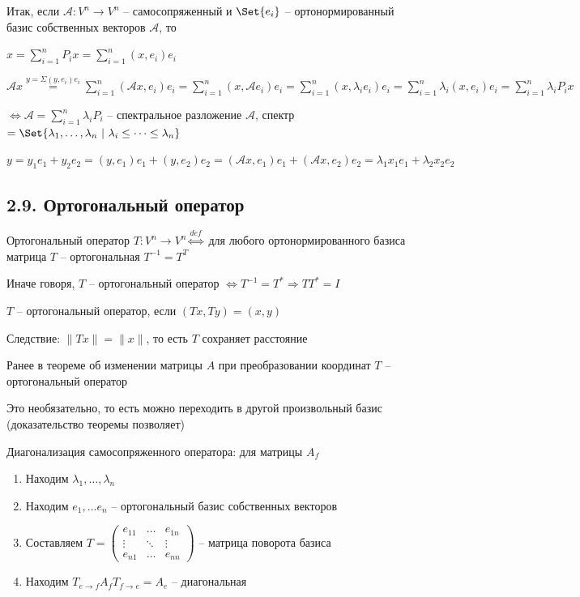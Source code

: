 \documentclass[12pt]{article}
\begin{document}
    Итак, если $\mathcal{A}: V^n \to V^n$ -- самосопряженный и $\Set{e_i}$ -- ортонормированный базис собственных векторов $\mathcal{A}$, то

    $x = \sum_{i = 1}^{n} P_i x = \sum_{i = 1}^{n} (x, e_i) e_i$

    $\mathcal{A} x \stackrel{y = \Sigma (y, e_i) e_i}{=} \sum_{i = 1}^{n} (\mathcal{A}x, e_i) e_i =
    \sum_{i = 1}^{n} (x, \mathcal{A}e_i) e_i = \sum_{i = 1}^{n} (x, \lambda_i e_i) e_i =
    \sum_{i = 1}^{n} \lambda_i (x, e_i) e_i = \sum_{i = 1}^{n} \lambda_i P_i x$

    $\Longleftrightarrow \mathcal{A} = \sum_{i = 1}^{n} \lambda_i P_i$ -- спектральное разложение $\mathcal{A}$,
    спектр $= \Set{\lambda_1, \dots, \lambda_n \ | \ \lambda_i \leq \dots \leq \lambda_n}$

    \Ex $y = y_1 e_1 + y_2 e_2 = (y, e_1) e_1 + (y, e_2) e_2 = (\mathcal{A}x, e_1) e_1 + (\mathcal{A}x, e_2) e_2 = \lambda_1 x_1 e_1 + \lambda_2 x_2 e_2$

    \subsection[p2\_9]{2.9. Ортогональный оператор}

    \hypertarget{orthogonaloperator}{}

    \Mem Ортогональный оператор $T: V^n \to V^n \overset{def}{\Longleftrightarrow}$ для любого ортонормированного базиса матрица $T$ -- ортогональная $T^{-1} = T^T$

    \Nota Иначе говоря, $T$ -- ортогональный оператор $\Longleftrightarrow T^{-1} = T^* \Longrightarrow T T^* = I$

    \Def $T$ -- ортогональный оператор, если $(Tx, Ty) = (x, y)$

    Следствие: $\|Tx\| = \|x\|$, то есть $T$ сохраняет расстояние

    \Nota Ранее в теореме об изменении матрицы $A$ при преобразовании координат $T$ -- ортогональный оператор

    Это необязательно, то есть можно переходить в другой произвольный базис (доказательство теоремы позволяет)

    Диагонализация самосопряженного оператора: для матрицы $A_f$

    \begin{enumerate}
        \item Находим $\lambda_1, \dots, \lambda_n$

        \item Находим $e_1, \dots e_n$ -- ортогональный базис собственных векторов

        \item Составляем $T = \begin{pmatrix}e_{11} & \dots & e_{1n} \\ \vdots & \ddots & \vdots \\ e_{n1} & \dots & e_{nn}\end{pmatrix}$ -- матрица поворота базиса

        \item Находим $T_{e\to f}A_f T_{f\to e} = A_e$ -- диагональная
    \end{enumerate}
\end{document}
